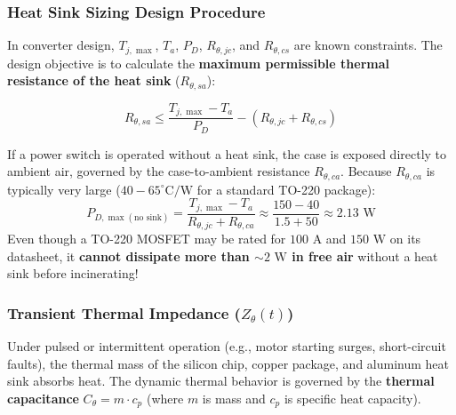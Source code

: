 \documentclass[11pt,a4paper]{article}
\begin{document}
\subsubsection{Heat Sink Sizing Design Procedure}
In converter design, $T_{j,\max}$, $T_a$, $P_D$, $R_{\theta,jc}$, and $R_{\theta,cs}$ are known constraints. The design objective is to calculate the \textbf{maximum permissible thermal resistance of the heat sink} ($R_{\theta,sa}$):

\begin{formulabox}
\begin{equation}
R_{\theta,sa} \le \frac{T_{j,\max} - T_a}{P_D} - (R_{\theta,jc} + R_{\theta,cs})
\end{equation}
\end{formulabox}

\begin{alertbox}
If a power switch is operated without a heat sink, the case is exposed directly to ambient air, governed by the case-to-ambient resistance $R_{\theta,ca}$. Because $R_{\theta,ca}$ is typically very large ($40 - 65^\circ\text{C/W}$ for a standard TO-220 package):
\begin{equation}
P_{D,\max (\text{no sink})} = \frac{T_{j,\max} - T_a}{R_{\theta,jc} + R_{\theta,ca}} \approx \frac{150 - 40}{1.5 + 50} \approx 2.13\text{ W}
\end{equation}
Even though a TO-220 MOSFET may be rated for $100\text{ A}$ and $150\text{ W}$ on its datasheet, it \textbf{cannot dissipate more than $\sim 2\text{ W}$ in free air} without a heat sink before incinerating!
\end{alertbox}

\subsubsection{Transient Thermal Impedance ($Z_{\theta}(t)$)}
Under pulsed or intermittent operation (e.g., motor starting surges, short-circuit faults), the thermal mass of the silicon chip, copper package, and aluminum heat sink absorbs heat. The dynamic thermal behavior is governed by the \textbf{thermal capacitance} $C_\theta = m \cdot c_p$ (where $m$ is mass and $c_p$ is specific heat capacity).
\end{document}
